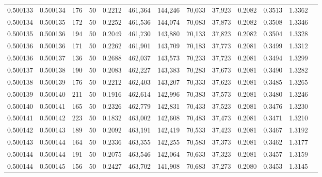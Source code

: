 \begin{tabular}{rrrrrrrrrrrrr}
0.500133 & 0.500134 & 176 &  50 &                                     0.2212 & 461,364 & 144,246 &  70,033 &  37,923 & 0.2082 & 0.3513 & 1.3362 \\
0.500134 & 0.500135 & 172 &  50 &                                     0.2252 & 461,536 & 144,074 &  70,083 &  37,873 & 0.2082 & 0.3508 & 1.3346 \\
0.500135 & 0.500136 & 194 &  50 &                                     0.2049 & 461,730 & 143,880 &  70,133 &  37,823 & 0.2082 & 0.3504 & 1.3328 \\
0.500136 & 0.500136 & 171 &  50 &                                     0.2262 & 461,901 & 143,709 &  70,183 &  37,773 & 0.2081 & 0.3499 & 1.3312 \\
0.500136 & 0.500137 & 136 &  50 &                                     0.2688 & 462,037 & 143,573 &  70,233 &  37,723 & 0.2081 & 0.3494 & 1.3299 \\
0.500137 & 0.500138 & 190 &  50 &                                     0.2083 & 462,227 & 143,383 &  70,283 &  37,673 & 0.2081 & 0.3490 & 1.3282 \\
0.500138 & 0.500139 & 176 &  50 &                                     0.2212 & 462,403 & 143,207 &  70,333 &  37,623 & 0.2081 & 0.3485 & 1.3265 \\
0.500139 & 0.500140 & 211 &  50 &                                     0.1916 & 462,614 & 142,996 &  70,383 &  37,573 & 0.2081 & 0.3480 & 1.3246 \\
0.500140 & 0.500141 & 165 &  50 &                                     0.2326 & 462,779 & 142,831 &  70,433 &  37,523 & 0.2081 & 0.3476 & 1.3230 \\
0.500141 & 0.500142 & 223 &  50 &                                     0.1832 & 463,002 & 142,608 &  70,483 &  37,473 & 0.2081 & 0.3471 & 1.3210 \\
0.500142 & 0.500143 & 189 &  50 &                                     0.2092 & 463,191 & 142,419 &  70,533 &  37,423 & 0.2081 & 0.3467 & 1.3192 \\
0.500143 & 0.500144 & 164 &  50 &                                     0.2336 & 463,355 & 142,255 &  70,583 &  37,373 & 0.2081 & 0.3462 & 1.3177 \\
0.500144 & 0.500144 & 191 &  50 &                                     0.2075 & 463,546 & 142,064 &  70,633 &  37,323 & 0.2081 & 0.3457 & 1.3159 \\
0.500144 & 0.500145 & 156 &  50 &                                     0.2427 & 463,702 & 141,908 &  70,683 &  37,273 & 0.2080 & 0.3453 & 1.3145 \\

\end{tabular}
